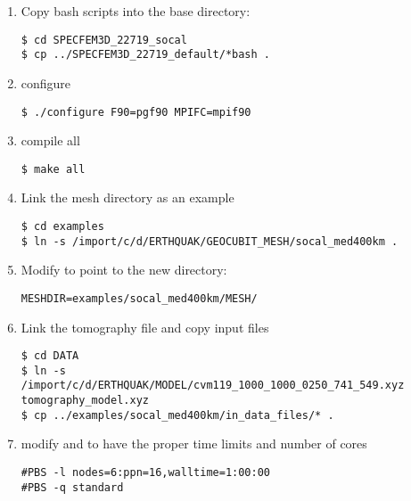 \documentclass[10pt,fleqn,letterpaper]{article}
\begin{document}
\begin{enumerate}
\item Copy bash scripts into the base directory:

\begin{lstlisting}
$ cd SPECFEM3D_22719_socal
$ cp ../SPECFEM3D_22719_default/*bash .
\end{lstlisting}

\item configure
\begin{lstlisting}
$ ./configure F90=pgf90 MPIFC=mpif90
\end{lstlisting}

\item compile all
\begin{lstlisting}
$ make all
\end{lstlisting}

\item Link the mesh directory as an example
\begin{lstlisting}
$ cd examples
$ ln -s /import/c/d/ERTHQUAK/GEOCUBIT_MESH/socal_med400km .
\end{lstlisting}

\item Modify  to point to the new directory:
\begin{lstlisting}
MESHDIR=examples/socal_med400km/MESH/
\end{lstlisting}

\item Link the tomography file and copy input files
\begin{lstlisting}
$ cd DATA
$ ln -s /import/c/d/ERTHQUAK/MODEL/cvm119_1000_1000_0250_741_549.xyz tomography_model.xyz
$ cp ../examples/socal_med400km/in_data_files/* .
\end{lstlisting}

\item modify  and  to have the proper time limits and number of cores
\begin{lstlisting}
#PBS -l nodes=6:ppn=16,walltime=1:00:00
#PBS -q standard
\end{lstlisting}

%
%


\end{enumerate}
\end{document}
